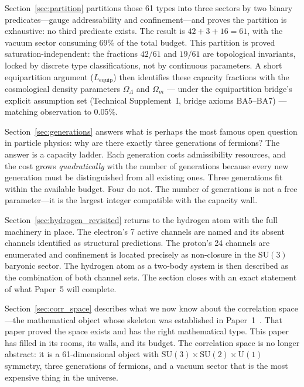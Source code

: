 \documentclass[11pt]{article}
\newcommand{\SU}{\mathrm{SU}}
\newcommand{\U}{\mathrm{U}}
\begin{document}
Section~\ref{sec:partition} partitions those 61 types into three sectors by two binary predicates---gauge addressability and confinement---and proves the partition is exhaustive: no third predicate exists.  The result is $42 + 3 + 16 = 61$, with the vacuum sector consuming 69\% of the total budget.  This partition is proved saturation-independent: the fractions $42/61$ and $19/61$ are topological invariants, locked by discrete type classifications, not by continuous parameters.  A short equipartition argument ($L_{\mathrm{equip}}$) then identifies these capacity fractions with the cosmological density parameters $\Omega_\Lambda$ and $\Omega_m$ --- under the equipartition bridge's explicit assumption set (Technical Supplement~I, bridge axioms BA5--BA7) --- matching observation to 0.05\%.

Section~\ref{sec:generations} answers what is perhaps the most famous open question in particle physics: why are there exactly three generations of fermions?  The answer is a capacity ladder.  Each generation costs admissibility resources, and the cost grows \emph{quadratically} with the number of generations because every new generation must be distinguished from all existing ones.  Three generations fit within the available budget.  Four do not.  The number of generations is not a free parameter---it is the largest integer compatible with the capacity wall.

Section~\ref{sec:hydrogen_revisited} returns to the hydrogen atom with the full machinery in place.  The electron's 7 active channels are named and its absent channels identified as structural predictions.  The proton's 24 channels are enumerated and confinement is located precisely as non-closure in the $\SU(3)$ baryonic sector.  The hydrogen atom as a two-body system is then described as the combination of both channel sets.  The section closes with an exact statement of what Paper~5 will complete.

Section~\ref{sec:corr_space} describes what we now know about the correlation space---the mathematical object whose skeleton was established in Paper~1~\cite{BrookePaper1}.  That paper proved the space exists and has the right mathematical type.  This paper has filled in its rooms, its walls, and its budget.  The correlation space is no longer abstract: it is a 61-dimensional object with $\SU(3) \times \SU(2) \times \U(1)$ symmetry, three generations of fermions, and a vacuum sector that is the most expensive thing in the universe.
\end{document}

